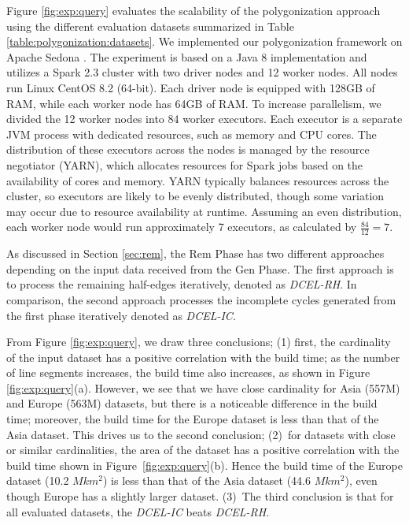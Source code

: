 Figure \ref{fig:exp:query} evaluates the scalability of the polygonization approach using the different evaluation datasets summarized in Table 
\ref{table:polygonization:datasets}.  We implemented our polygonization framework on Apache Sedona \cite{yu_spatial_2018}. The experiment is based on a Java 8  
implementation and utilizes a Spark 2.3 cluster with two driver nodes and 12 worker nodes. All nodes run Linux CentOS 8.2 (64-bit). Each driver node is 
equipped 
with 128GB of RAM, while each worker node has 64GB of RAM. To increase parallelism, we divided the 12 worker nodes into 84 worker executors. Each executor is a 
separate JVM process with dedicated resources, such as memory and CPU cores. The distribution of these executors across the nodes is managed by the resource 
negotiator (YARN), which allocates resources for Spark jobs based on the availability of cores and memory. YARN typically balances resources across the 
cluster, 
so executors are likely to be evenly distributed, though some variation may occur due to resource availability at runtime. Assuming an even distribution, each 
worker node would run approximately 7 executors, as calculated by $\frac{84}{12} = 7$.

As discussed in Section \ref{sec:rem}, the Rem Phase has two different approaches depending on the input data received from the Gen Phase. The first approach 
is to process the remaining half-edges iteratively, denoted as \textit{DCEL-RH}. In comparison, the second approach processes the incomplete cycles generated 
from the first phase iteratively denoted as \textit{DCEL-IC}.

From Figure \ref{fig:exp:query}, we draw three conclusions; 
(1) first, the cardinality of the input dataset has a positive correlation with the build time; as the number of line segments increases, the build time also 
increases, as shown in Figure \ref{fig:exp:query}(a). However, we see that we have close cardinality for Asia (557M) and Europe (563M) datasets, but there is a 
noticeable difference in the build time; moreover, the build time for the Europe dataset is less than that of the Asia dataset. 
This drives us to the second conclusion;  
(2)~for datasets with close or similar cardinalities, the area of the dataset has a positive correlation with the build time shown in 
Figure~\ref{fig:exp:query}(b). 
Hence the build time of the Europe dataset (10.2 $Mkm^2$) is less than that of the Asia dataset (44.6 $Mkm^2$), even though Europe has a slightly larger 
dataset.
(3)~The third conclusion is that for all evaluated datasets, the \textit{DCEL-IC} beats \textit{DCEL-RH}.

